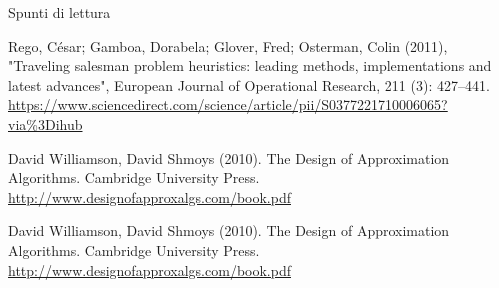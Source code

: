 \begin{frame}{Spunti di lettura}

\begin{block}{}
Rego, César; Gamboa, Dorabela; Glover, Fred; Osterman, Colin (2011), "Traveling salesman problem heuristics: leading methods, implementations and latest advances", European Journal of Operational Research, 211 (3): 427–441.
\url{https://www.sciencedirect.com/science/article/pii/S0377221710006065?via\%3Dihub}

\end{block}

\begin{block}{}
David Williamson, David Shmoys (2010). The Design of Approximation Algorithms. Cambridge University Press.\\
\url{http://www.designofapproxalgs.com/book.pdf}
\end{block}

\begin{block}{}
David Williamson, David Shmoys (2010). The Design of Approximation Algorithms. Cambridge University Press.\\
\url{http://www.designofapproxalgs.com/book.pdf}
\end{block}


\end{frame}









\begin{frame}{}

\end{frame}




